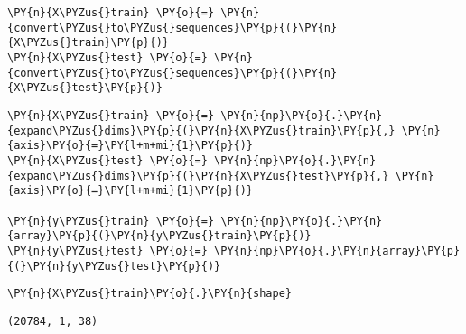     \begin{tcolorbox}[breakable, size=fbox, boxrule=1pt, pad at break*=1mm,colback=cellbackground, colframe=cellborder]
\begin{Verbatim}[commandchars=\\\{\}]
\PY{n}{X\PYZus{}train} \PY{o}{=} \PY{n}{convert\PYZus{}to\PYZus{}sequences}\PY{p}{(}\PY{n}{X\PYZus{}train}\PY{p}{)}
\PY{n}{X\PYZus{}test} \PY{o}{=} \PY{n}{convert\PYZus{}to\PYZus{}sequences}\PY{p}{(}\PY{n}{X\PYZus{}test}\PY{p}{)}
\end{Verbatim}
\end{tcolorbox}

    \begin{tcolorbox}[breakable, size=fbox, boxrule=1pt, pad at break*=1mm,colback=cellbackground, colframe=cellborder]
\begin{Verbatim}[commandchars=\\\{\}]
\PY{n}{X\PYZus{}train} \PY{o}{=} \PY{n}{np}\PY{o}{.}\PY{n}{expand\PYZus{}dims}\PY{p}{(}\PY{n}{X\PYZus{}train}\PY{p}{,} \PY{n}{axis}\PY{o}{=}\PY{l+m+mi}{1}\PY{p}{)}
\PY{n}{X\PYZus{}test} \PY{o}{=} \PY{n}{np}\PY{o}{.}\PY{n}{expand\PYZus{}dims}\PY{p}{(}\PY{n}{X\PYZus{}test}\PY{p}{,} \PY{n}{axis}\PY{o}{=}\PY{l+m+mi}{1}\PY{p}{)}

\PY{n}{y\PYZus{}train} \PY{o}{=} \PY{n}{np}\PY{o}{.}\PY{n}{array}\PY{p}{(}\PY{n}{y\PYZus{}train}\PY{p}{)}
\PY{n}{y\PYZus{}test} \PY{o}{=} \PY{n}{np}\PY{o}{.}\PY{n}{array}\PY{p}{(}\PY{n}{y\PYZus{}test}\PY{p}{)}
\end{Verbatim}
\end{tcolorbox}

    \begin{tcolorbox}[breakable, size=fbox, boxrule=1pt, pad at break*=1mm,colback=cellbackground, colframe=cellborder]
\begin{Verbatim}[commandchars=\\\{\}]
\PY{n}{X\PYZus{}train}\PY{o}{.}\PY{n}{shape}
\end{Verbatim}
\end{tcolorbox}

            \begin{tcolorbox}[breakable, size=fbox, boxrule=.5pt, pad at break*=1mm, opacityfill=0]
\begin{Verbatim}[commandchars=\\\{\}]
(20784, 1, 38)
\end{Verbatim}
\end{tcolorbox}
        
